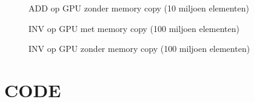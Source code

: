 \documentclass[twoside,a4paper]{article}
\begin{document}
\begin{figure}[H]
    \centering
    
    \caption{ADD op GPU zonder memory copy (10 miljoen elementen)}
    \label{fig:ADD_gpu_without_memcopy_10mil}
\end{figure}


\begin{figure}[H]
    \centering
    
    \caption{INV op GPU met memory copy (100 miljoen elementen)}
    \label{fig:INV_gpu_with_memcopy_100mil}
\end{figure}

\begin{figure}[H]
    \centering
    
    \caption{INV op GPU zonder memory copy (100 miljoen elementen)}
    \label{fig:INV_gpu_without_memcopy_100mil}
\end{figure}


\newpage
\section{CODE}
\label{code}
\inputminted[linenos=true, breaklines=true]{cuda}{template.cu}

\clearpage



\end{document}

